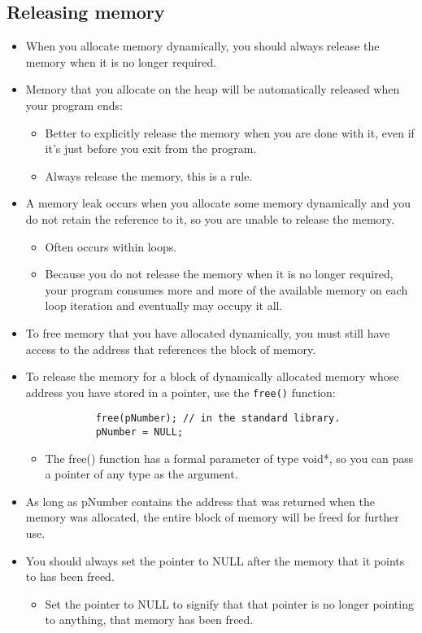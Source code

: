 \subsection{Releasing memory}
\begin{itemize}
    \item When you allocate memory dynamically, you should always release the memory when it is no longer required.
    \item Memory that you allocate on the heap will be automatically released when your program ends:
        \begin{itemize}
            \item Better to explicitly release the memory when you are done with it, even if it's just before you exit from the program. 
            \item Always release the memory, this is a rule. 
        \end{itemize}
    
    \item A memory leak occurs when you allocate some memory dynamically and you do not retain the reference to it, so you are unable to release the memory. 
        \begin{itemize}
            \item Often occurs within loops. 
            \item Because you do not release the memory when it is no longer required, your program consumes more and more of the available memory on each loop iteration and eventually may occupy it all. 
        \end{itemize}
    
    \item To free memory that you have allocated dynamically, you must still have access to the address that references the block of memory. 
    \item To release the memory for a block of dynamically allocated memory whose address you have stored in a pointer, use the \texttt{free()} function:
        \begin{verbatim}
            free(pNumber); // in the standard library.
            pNumber = NULL; 
        \end{verbatim}
        \begin{itemize}
            \item The free() function has a formal parameter of type void*, so you can pass a pointer of any type as the argument.  
        \end{itemize}    
    
    \item As long as pNumber contains the address that was returned when the memory was allocated, the entire block of memory will be freed for further use. 
    \item You should always set the pointer to NULL after the memory that it points to has been freed. 
        \begin{itemize}
            \item Set the pointer to NULL to signify that that pointer is no longer pointing to anything, that memory has been freed.
        \end{itemize}
\end{itemize}

